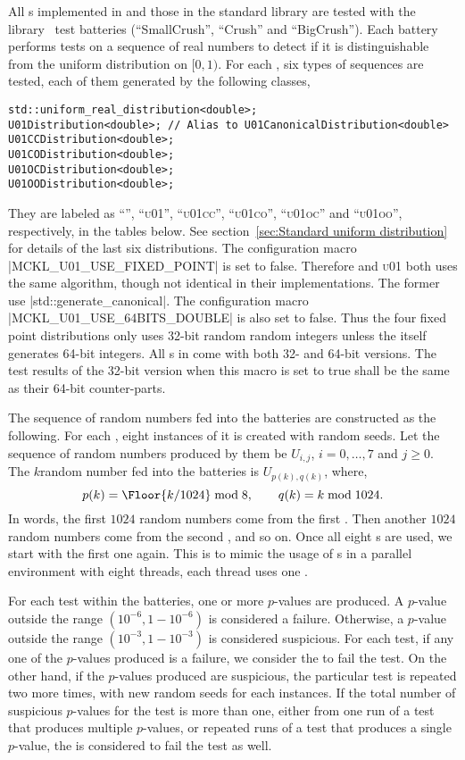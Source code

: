 All \rng{}s implemented in \mckl and those in the standard library are tested
with the \testu library~\cite{Lecuyer:2007hv} test batteries (``SmallCrush'',
``Crush'' and ``BigCrush''). Each battery performs tests on a sequence of real
numbers to detect if it is distinguishable from the uniform distribution on
$[0, 1)$. For each \rng, six types of sequences are tested, each of them
generated by the following classes,
\begin{verbatim}
std::uniform_real_distribution<double>;
U01Distribution<double>; // Alias to U01CanonicalDistribution<double>
U01CCDistribution<double>;
U01CODistribution<double>;
U01OCDistribution<double>;
U01OODistribution<double>;
\end{verbatim}
They are labeled as ``\std'', ``\textsc{u01}'', ``\textsc{u01cc}'',
``\textsc{u01co}'', ``\textsc{u01oc}'' and ``\textsc{u01oo}'', respectively, in
the tables below. See section~\ref{sec:Standard uniform distribution} for
details of the last six distributions. The configuration macro
|MCKL_U01_USE_FIXED_POINT| is set to false. Therefore \std and \textsc{u01}
both uses the same algorithm, though not identical in their implementations.
The former use |std::generate_canonical|. The configuration macro
|MCKL_U01_USE_64BITS_DOUBLE| is also set to false. Thus the four fixed point
distributions only uses 32-bit random random integers unless the \rng itself
generates 64-bit integers. All \rng{}s in \mckl come with both 32- and 64-bit
versions. The test results of the 32-bit version when this macro is set to true
shall be the same as their 64-bit counter-parts.

The sequence of random numbers fed into the \testu batteries are constructed as
the following. For each \rng, eight instances of it is created with random
seeds. Let the sequence of random numbers produced by them be $U_{i,j}$, $i =
0,\dots,7$ and $j\ge0$. The $k$\sth random number fed into the batteries is
$U_{p(k), q(k)}$, where,
\begin{equation*}
  p(k) = \Floor{k / 1024} \bmod 8, \qquad q(k) = k \bmod 1024.
\end{equation*}
In words, the first $1024$ random numbers come from the first \rng. Then
another $1024$ random numbers come from the second \rng, and so on. Once all
eight \rng{}s are used, we start with the first one again. This is to mimic the
usage of \rng{}s in a parallel environment with eight threads, each thread uses
one \rng.

For each test within the batteries, one or more $p$-values are produced. A
$p$-value outside the range $(10^{-6}, 1 - 10^{-6})$ is considered a failure.
Otherwise, a $p$-value outside the range $(10^{-3}, 1 - 10^{-3})$ is considered
suspicious. For each test, if any one of the $p$-values produced is a failure,
we consider the \rng to fail the test. On the other hand, if the $p$-values
produced are suspicious, the particular test is repeated two more times, with
new random seeds for each \rng instances. If the total number of suspicious
$p$-values for the test is more than one, either from one run of a test that
produces multiple $p$-values, or repeated runs of a test that produces a single
$p$-value, the \rng is considered to fail the test as well.

